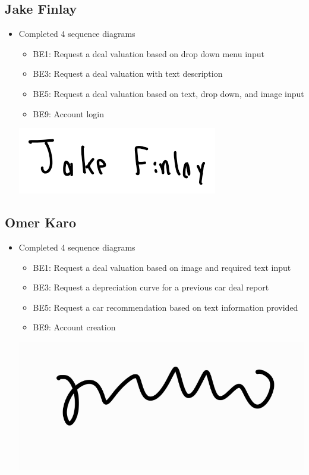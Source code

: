 \documentclass[]{article}
\begin{document}
\subsection{Jake Finlay}
\begin{itemize}
  \item Completed 4 sequence diagrams
        \begin{itemize}
          \item BE1: Request a deal valuation based on drop down menu input
          \item BE3: Request a deal valuation with text description
          \item BE5: Request a deal valuation based on text, drop down, and image input
          \item BE9: Account login
        \end{itemize}
        \begin{center}
          \includegraphics[scale=0.6]{jake.png}
        \end{center}
\end{itemize}

\subsection{Omer Karo}
\begin{itemize}
  \item Completed 4 sequence diagrams
        \begin{itemize}
          \item BE1: Request a deal valuation based on image and required text input
          \item BE3: Request a depreciation curve for a previous car deal report
          \item BE5: Request a car recommendation based on text information provided
          \item BE9: Account creation
        \end{itemize}
        \begin{center}
          \includegraphics[scale=0.3]{omer.jpg}
        \end{center}
\end{itemize}
\end{document}
